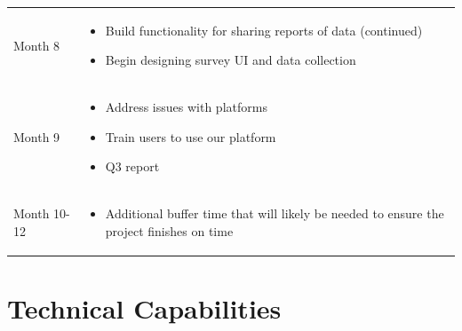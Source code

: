 \begin{table}[H]
\begin{tabularx}{\textwidth}{|l|X|}
\begin{minipage}{\linewidth}
        \vspace{-2pt}
        \end{minipage}\\\hline
      Month 8 & \begin{minipage}{\linewidth}
        \vspace{6pt}
        \begin{itemize}[itemsep=3pt,parsep=-1pt,leftmargin=*]
        \item Build functionality for sharing reports of data (continued)
        \item Begin designing survey UI and data collection
        \end{itemize}
        \vspace{-2pt}
        \end{minipage}\\\hline
      Month 9 & \begin{minipage}{\linewidth}
        \vspace{6pt}
        \begin{itemize}[itemsep=3pt,parsep=-1pt,leftmargin=*]
        \item Address issues with platforms
        \item Train users to use our platform
        \item Q3 report
        \end{itemize}
        \vspace{-2pt}
        \end{minipage}\\\hline
      Month 10-12 & \begin{minipage}{\linewidth}
        \vspace{6pt}
        \begin{itemize}[itemsep=3pt,parsep=-1pt,leftmargin=*]
        \item Additional buffer time that will likely be needed to ensure the project finishes on time
        \end{itemize}
        \vspace{-2pt}
        \end{minipage}\\\hline
  \end{tabularx}
\end{table}

\clearpage
\section{Technical Capabilities}

